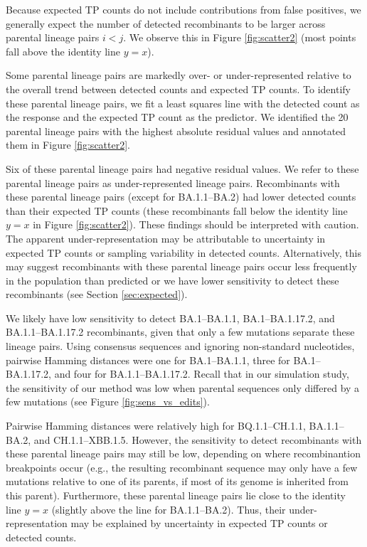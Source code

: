 \documentclass[11pt,oneside,letterpaper]{article}
\begin{document}
Because expected TP counts do not include contributions from false positives, we generally expect the number of detected recombinants to be larger across parental lineage pairs $i < j$. We observe this in Figure \ref{fig:scatter2} (most points fall above the identity line $y = x$). 

Some parental lineage pairs are markedly over- or under-represented relative to the overall trend between detected counts and expected TP counts. To identify these parental lineage pairs, we fit a least squares line with the detected count as the response and the expected TP count as the predictor. We identified the 20 parental lineage pairs with the highest absolute residual values and annotated them in Figure \ref{fig:scatter2}. 


Six of these parental lineage pairs had negative residual values. We refer to these parental lineage pairs as under-represented lineage pairs. Recombinants with these parental lineage pairs (except for BA.1.1--BA.2) had lower detected counts than their expected TP counts (these recombinants fall below the identity line $y = x$ in Figure \ref{fig:scatter2}). These findings should be interpreted with caution. The apparent under-representation may be attributable to uncertainty in expected TP counts or sampling variability in detected counts. Alternatively, this may suggest recombinants with these parental lineage pairs occur less frequently in the population than predicted or we have lower sensitivity to detect these recombinants (see Section \ref{sec:expected}). 

We likely have low sensitivity to detect BA.1--BA.1.1, BA.1--BA.1.17.2, and BA.1.1--BA.1.17.2 recombinants, given that only a few mutations separate these lineage pairs. Using consensus sequences and ignoring non-standard nucleotides, pairwise Hamming distances were one for BA.1--BA.1.1, three for BA.1--BA.1.17.2, and four for BA.1.1--BA.1.17.2. Recall that in our simulation study, the sensitivity of our method was low when parental sequences only differed by a few mutations (see Figure \ref{fig:sens_vs_edits}).

Pairwise Hamming distances were relatively high for BQ.1.1--CH.1.1, BA.1.1--BA.2, and CH.1.1--XBB.1.5. However, the sensitivity to detect recombinants with these parental lineage pairs may still be low, depending on where recombinantion breakpoints occur (e.g., the resulting recombinant sequence may only have a few mutations relative to one of its parents, if most of its genome is inherited from this parent). Furthermore, these parental lineage pairs lie close to the identity line $y = x$ (slightly above the line for BA.1.1--BA.2). Thus, their under-representation may be explained by uncertainty in expected TP counts or detected counts.
\end{document}
